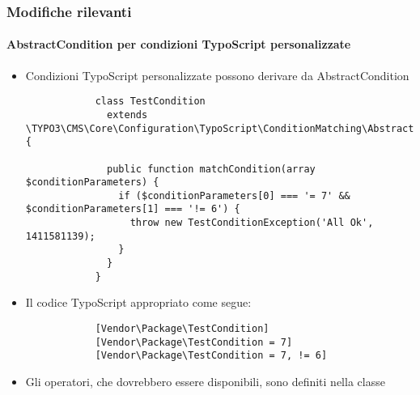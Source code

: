 \begin{frame}[fragile]
	\frametitle{Modifiche rilevanti}
	\framesubtitle{AbstractCondition per condizioni TypoScript personalizzate}

	\lstset{
		basicstyle=\tiny\ttfamily
	}

	\begin{itemize}
		\item Condizioni TypoScript personalizzate possono derivare da AbstractCondition

		\begin{lstlisting}
			class TestCondition
			  extends \TYPO3\CMS\Core\Configuration\TypoScript\ConditionMatching\AbstractCondition {

			  public function matchCondition(array $conditionParameters) {
 			    if ($conditionParameters[0] === '= 7' && $conditionParameters[1] === '!= 6') {
			      throw new TestConditionException('All Ok', 1411581139);
			    }
			  }
			}
		\end{lstlisting}

		\item Il codice TypoScript appropriato come segue:

		\begin{lstlisting}
			[Vendor\Package\TestCondition]
			[Vendor\Package\TestCondition = 7]
			[Vendor\Package\TestCondition = 7, != 6]
		\end{lstlisting}

		\item Gli operatori, che dovrebbero essere disponibili, sono definiti nella classe

	\end{itemize}

\end{frame}


